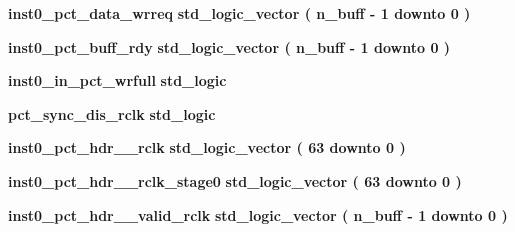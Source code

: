 \begin{DoxyCompactItemize}
\item 
{\bf inst0\+\_\+pct\+\_\+data\+\_\+wrreq} {\bfseries \textcolor{comment}{std\+\_\+logic\+\_\+vector}\textcolor{vhdlchar}{ }\textcolor{vhdlchar}{(}\textcolor{vhdlchar}{ }\textcolor{vhdlchar}{ }\textcolor{vhdlchar}{ }\textcolor{vhdlchar}{ }{\bfseries {\bf n\+\_\+buff}} \textcolor{vhdlchar}{-\/}\textcolor{vhdlchar}{ } \textcolor{vhdldigit}{1} \textcolor{vhdlchar}{ }\textcolor{keywordflow}{downto}\textcolor{vhdlchar}{ }\textcolor{vhdlchar}{ } \textcolor{vhdldigit}{0} \textcolor{vhdlchar}{ }\textcolor{vhdlchar}{)}\textcolor{vhdlchar}{ }} 
\item 
{\bf inst0\+\_\+pct\+\_\+buff\+\_\+rdy} {\bfseries \textcolor{comment}{std\+\_\+logic\+\_\+vector}\textcolor{vhdlchar}{ }\textcolor{vhdlchar}{(}\textcolor{vhdlchar}{ }\textcolor{vhdlchar}{ }\textcolor{vhdlchar}{ }\textcolor{vhdlchar}{ }{\bfseries {\bf n\+\_\+buff}} \textcolor{vhdlchar}{-\/}\textcolor{vhdlchar}{ } \textcolor{vhdldigit}{1} \textcolor{vhdlchar}{ }\textcolor{keywordflow}{downto}\textcolor{vhdlchar}{ }\textcolor{vhdlchar}{ } \textcolor{vhdldigit}{0} \textcolor{vhdlchar}{ }\textcolor{vhdlchar}{)}\textcolor{vhdlchar}{ }} 
\item 
{\bf inst0\+\_\+in\+\_\+pct\+\_\+wrfull} {\bfseries \textcolor{comment}{std\+\_\+logic}\textcolor{vhdlchar}{ }} 
\item 
{\bf pct\+\_\+sync\+\_\+dis\+\_\+rclk} {\bfseries \textcolor{comment}{std\+\_\+logic}\textcolor{vhdlchar}{ }} 
\item 
{\bf inst0\+\_\+pct\+\_\+hdr\+\_\+\_\+rclk} {\bfseries \textcolor{comment}{std\+\_\+logic\+\_\+vector}\textcolor{vhdlchar}{ }\textcolor{vhdlchar}{(}\textcolor{vhdlchar}{ }\textcolor{vhdlchar}{ } \textcolor{vhdldigit}{63} \textcolor{vhdlchar}{ }\textcolor{keywordflow}{downto}\textcolor{vhdlchar}{ }\textcolor{vhdlchar}{ } \textcolor{vhdldigit}{0} \textcolor{vhdlchar}{ }\textcolor{vhdlchar}{)}\textcolor{vhdlchar}{ }} 
\item 
{\bf inst0\+\_\+pct\+\_\+hdr\+\_\+\_\+rclk\+\_\+stage0} {\bfseries \textcolor{comment}{std\+\_\+logic\+\_\+vector}\textcolor{vhdlchar}{ }\textcolor{vhdlchar}{(}\textcolor{vhdlchar}{ }\textcolor{vhdlchar}{ } \textcolor{vhdldigit}{63} \textcolor{vhdlchar}{ }\textcolor{keywordflow}{downto}\textcolor{vhdlchar}{ }\textcolor{vhdlchar}{ } \textcolor{vhdldigit}{0} \textcolor{vhdlchar}{ }\textcolor{vhdlchar}{)}\textcolor{vhdlchar}{ }} 
\item 
{\bf inst0\+\_\+pct\+\_\+hdr\+\_\+\_\+valid\+\_\+rclk} {\bfseries \textcolor{comment}{std\+\_\+logic\+\_\+vector}\textcolor{vhdlchar}{ }\textcolor{vhdlchar}{(}\textcolor{vhdlchar}{ }\textcolor{vhdlchar}{ }\textcolor{vhdlchar}{ }\textcolor{vhdlchar}{ }{\bfseries {\bf n\+\_\+buff}} \textcolor{vhdlchar}{-\/}\textcolor{vhdlchar}{ } \textcolor{vhdldigit}{1} \textcolor{vhdlchar}{ }\textcolor{keywordflow}{downto}\textcolor{vhdlchar}{ }\textcolor{vhdlchar}{ } \textcolor{vhdldigit}{0} \textcolor{vhdlchar}{ }\textcolor{vhdlchar}{)}\textcolor{vhdlchar}{ }} 

\end{DoxyCompactItemize}
